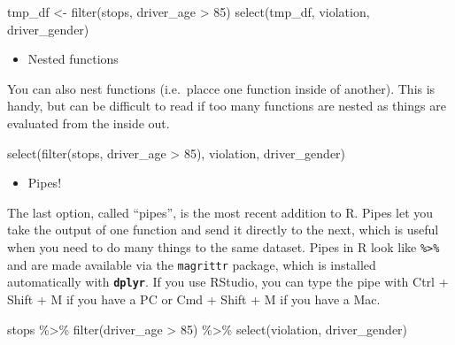 \documentclass[
]{book}
\newenvironment{Shaded}{\begin{snugshade}}{\end{snugshade}}
\newcommand{\DecValTok}[1]{\textcolor[rgb]{0.00,0.00,0.81}{#1}}
\newcommand{\FunctionTok}[1]{\textcolor[rgb]{0.00,0.00,0.00}{#1}}
\newcommand{\NormalTok}[1]{#1}
\newcommand{\OtherTok}[1]{\textcolor[rgb]{0.56,0.35,0.01}{#1}}
\newcommand{\SpecialCharTok}[1]{\textcolor[rgb]{0.00,0.00,0.00}{#1}}
\providecommand{\tightlist}{%
  \setlength{\itemsep}{0pt}\setlength{\parskip}{0pt}}
\begin{document}
\begin{Shaded}
\begin{Highlighting}[]
\NormalTok{tmp\_df }\OtherTok{\textless{}{-}} \FunctionTok{filter}\NormalTok{(stops, driver\_age }\SpecialCharTok{\textgreater{}} \DecValTok{85}\NormalTok{)}
\FunctionTok{select}\NormalTok{(tmp\_df, violation, driver\_gender)}
\end{Highlighting}
\end{Shaded}

\begin{itemize}
\tightlist
\item
  Nested functions
\end{itemize}

You can also nest functions (i.e.~placce one function inside of another).
This is handy, but can be difficult to read if too many functions are nested as things are evaluated from the inside out.

\begin{Shaded}
\begin{Highlighting}[]
\FunctionTok{select}\NormalTok{(}\FunctionTok{filter}\NormalTok{(stops, driver\_age }\SpecialCharTok{\textgreater{}} \DecValTok{85}\NormalTok{), violation, driver\_gender)}
\end{Highlighting}
\end{Shaded}

\begin{itemize}
\tightlist
\item
  Pipes!
\end{itemize}

The last option, called ``pipes'', is the most recent addition to R. Pipes let you take
the output of one function and send it directly to the next, which is useful
when you need to do many things to the same dataset. Pipes in R look like
\texttt{\%\textgreater{}\%} and are made available via the \texttt{magrittr} package, which is installed automatically with \textbf{\texttt{dplyr}}. If you use RStudio, you can type the pipe with Ctrl
+ Shift + M if you have a PC or Cmd +
Shift + M if you have a Mac.

\begin{Shaded}
\begin{Highlighting}[]
\NormalTok{stops }\SpecialCharTok{\%\textgreater{}\%}
  \FunctionTok{filter}\NormalTok{(driver\_age }\SpecialCharTok{\textgreater{}} \DecValTok{85}\NormalTok{) }\SpecialCharTok{\%\textgreater{}\%}
  \FunctionTok{select}\NormalTok{(violation, driver\_gender)}
\end{Highlighting}
\end{Shaded}
\end{document}
